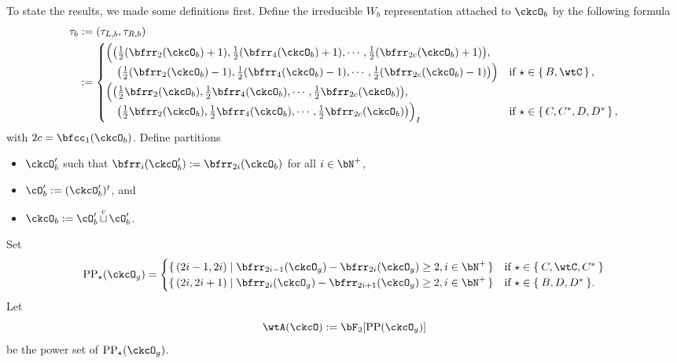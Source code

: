 \documentclass[12pt,a4paper]{amsart}
\numberwithin{equation}{section}
\theoremstyle{remark}
\def\half{{\tfrac{1}{2}}}
\def\cupcol{{\stackrel{c}{\sqcup}}}
\def\CPP{\mathrm{PP}}
\def\CPPs{\mathrm{PP}_{\star}}
\def\cupcol{{\,\stackrel{c}{\sqcup}\,}}
\begin{document}
  To state the results, we made some definitions first. Define the irreducible
  $W_{b}$ representation attached to $\ckcO_{b}$ by the following formula
  \begin{equation}\label{eq:taub}
    \begin{split}
      \tau_{b} & := (\tau_{L,b},\tau_{R,b})\\
      &:= \begin{cases}
        \Big(\big(\half(\bfrr_{2}(\ckcO_{b})+1), \half(\bfrr_{4}(\ckcO_{b})+1), \cdots, \half(\bfrr_{2c}(\ckcO_{b})+1)\big),\\
        \hspace{1em}\big(\half(\bfrr_{2}(\ckcO_{b})-1), \half(\bfrr_{4}(\ckcO_{b})-1), \cdots, \half(\bfrr_{2c}(\ckcO_{b})-1) \big)\Big)
        & \text{if } \star \in \set{B,\wtC},\\
        \Big( \big(\half\bfrr_{2}(\ckcO_{b}), \half\bfrr_{4}(\ckcO_{b}),\cdots, \half\bfrr_{2c}(\ckcO_{b})\big), \\
        \hspace{1em} \big(\half\bfrr_{2}(\ckcO_{b}), \half\bfrr_{4}(\ckcO_{b}),\cdots, \half\bfrr_{2c}(\ckcO_{b}) \big)\Big)_{I}
        & \text{if } \star \in \set{C,C^{*}, D,D^{*}},\\
      \end{cases}
    \end{split}
  \end{equation}
  with $2c = \bfcc_{1}(\ckcO_{b})$. Define partitions
  \begin{itemize}
    \item $\ckcO'_{b}$ such that $\bfrr_{i}(\ckcO'_{b}):= \bfrr_{2i}(\ckcO_{b})$
          for all $i\in \bN^{+}$,
    \item $\cO'_{b}:= (\ckcO'_{b})^{t}$, and
    \item $\ckcO_{b}:= \cO'_{b}\cupcol \cO'_{b}$.
  \end{itemize}

  Set
  \[
    \CPPs(\ckcO_{g}) =
    \begin{cases}
      \set{(2i-1,2i)| \bfrr_{2i-1}(\ckcO_{g})- \bfrr_{2i}(\ckcO_{g})\geq
        2, %
        i\in \bN^{+}} & \text{if $\star\in \Set{C,\wtC,C^{*}}$}\\
      \set{(2i,2i+1)| \bfrr_{2i}(\ckcO_{g})- \bfrr_{2i+1}(\ckcO_{g})\geq
        2, %
        i\in \bN^{+}} & \text{if $\star\in \Set{B,D,D^{*}}$}.
    \end{cases}
  \]
  Let
  \[
    \wtA(\ckcO) := \bF_{2}[\CPP(\ckcO_{g})]
  \] be the power set of $\CPPs(\ckcO_{g})$.
\end{document}
